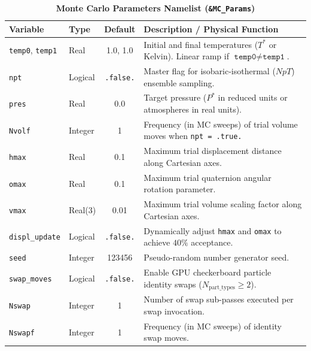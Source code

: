 \documentclass[final,5p,times,twocolumn]{elsarticle}
\begin{document}
\begin{table}[tbp]
\centering
\small
\caption{\textbf{Monte Carlo Parameters Namelist (\texttt{\&MC\_Params})}}
\label{tab:nml_mc}
\begin{tabularx}{\textwidth}{l l c X}
\toprule
\textbf{Variable} & \textbf{Type} & \textbf{Default} & \textbf{Description / Physical Function} \\
\midrule
\texttt{temp0}, \texttt{temp1} & Real & 1.0, 1.0 & Initial and final temperatures ($T^*$ or Kelvin). Linear ramp if $\texttt{temp0} \neq \texttt{temp1}$. \\
\texttt{npt} & Logical & \texttt{.false.} & Master flag for isobaric-isothermal ($NpT$) ensemble sampling. \\
\texttt{pres} & Real & 0.0 & Target pressure ($P^*$ in reduced units or atmospheres in real units). \\
\texttt{Nvolf} & Integer & 1 & Frequency (in MC sweeps) of trial volume moves when \texttt{npt = .true.} \\
\texttt{hmax} & Real & 0.1 & Maximum trial displacement distance along Cartesian axes. \\
\texttt{omax} & Real & 0.1 & Maximum trial quaternion angular rotation parameter. \\
\texttt{vmax} & Real(3) & 0.01 & Maximum trial volume scaling factor along Cartesian axes. \\
\texttt{displ\_update} & Logical & \texttt{.false.} & Dynamically adjust \texttt{hmax} and \texttt{omax} to achieve $40\%$ acceptance. \\
\texttt{seed} & Integer & 123456 & Pseudo-random number generator seed. \\
\texttt{swap\_moves} & Logical & \texttt{.false.} & Enable GPU checkerboard particle identity swaps ($N_{\text{part\_types}} \ge 2$). \\
\texttt{Nswap} & Integer & 1 & Number of swap sub-passes executed per swap invocation. \\
\texttt{Nswapf} & Integer & 1 & Frequency (in MC sweeps) of identity swap moves. \\
\bottomrule
\end{tabularx}
\end{table}
\end{document}
